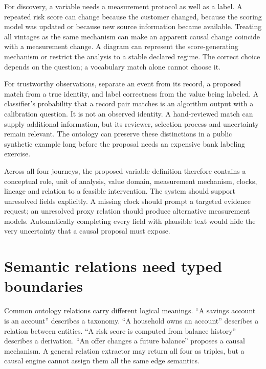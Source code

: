 For discovery, a variable needs a measurement protocol as well as a
label. A repeated risk score can change because the customer changed,
because the scoring model was updated or because new source information
became available. Treating all vintages as the same mechanism can make
an apparent causal change coincide with a measurement change. A diagram
can represent the score-generating mechanism or restrict the analysis to
a stable declared regime. The correct choice depends on the question; a
vocabulary match alone cannot choose it.

For trustworthy observations, separate an event from its record, a
proposed match from a true identity, and label correctness from the
value being labeled. A classifier's probability that a record pair
matches is an algorithm output with a calibration question. It is not an
observed identity. A hand-reviewed match can supply additional
information, but its reviewer, selection process and uncertainty remain
relevant. The ontology can preserve these distinctions in a public
synthetic example long before the proposal needs an expensive bank
labeling exercise.

Across all four journeys, the proposed variable definition therefore
contains a conceptual role, unit of analysis, value domain, measurement
mechanism, clocks, lineage and relation to a feasible intervention. The
system should support unresolved fields explicitly. A missing clock
should prompt a targeted evidence request; an unresolved proxy relation
should produce alternative measurement models. Automatically completing
every field with plausible text would hide the very uncertainty that a
causal proposal must expose.

\hypertarget{semantic-relations-need-typed-boundaries}{%
\section{Semantic relations need typed
boundaries}\label{semantic-relations-need-typed-boundaries}}

Common ontology relations carry different logical meanings. ``A savings
account is an account'' describes a taxonomy. ``A household owns an
account'' describes a relation between entities. ``A risk score is
computed from balance history'' describes a derivation. ``An offer
changes a future balance'' proposes a causal mechanism. A general
relation extractor may return all four as triples, but a causal engine
cannot assign them all the same edge semantics.


